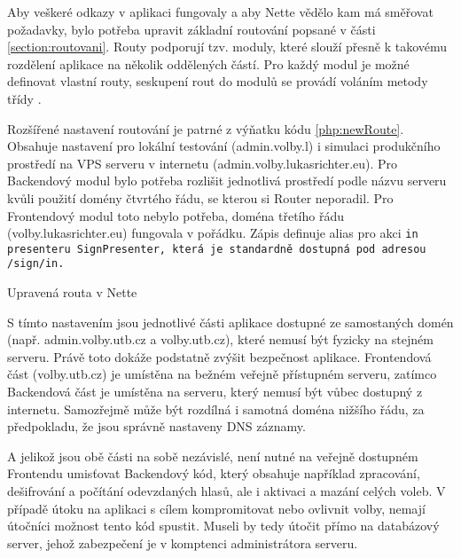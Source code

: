 Aby veškeré odkazy v aplikaci fungovaly a aby Nette vědělo kam má směřovat požadavky, bylo potřeba upravit základní routování popsané v části \ref{section:routovani}. Routy podporují tzv. moduly, které slouží přesně k takovému rozdělení aplikace na několik oddělených částí. Pro každý modul je možné definovat vlastní routy, seskupení rout do modulů se provádí voláním metody  %
třídy . 

Rozšířené nastavení routování je patrné z výňatku kódu \ref{php:newRoute}. Obsahuje nastavení pro lokální testování (admin.volby.l) i simulaci produkčního prostředí na VPS serveru v internetu (admin.volby.lukasrichter.eu). Pro Backendový modul bylo potřeba rozlišit jednotlivá prostředí podle názvu serveru kvůli použití domény čtvrtého řádu, se kterou si Router neporadil. Pro Frontendový modul toto nebylo potřeba, doména třetího řádu (volby.lukasrichter.eu) fungovala v pořádku. Zápis  definuje alias pro akci \tt{in} presenteru \tt{SignPresenter}, která je standardně dostupná pod adresou \tt{/sign/in}.

\begin{listing}[ht]
\caption{Upravená routa v Nette}
\label{php:newRoute}
\end{listing}

S tímto nastavením jsou jednotlivé části aplikace dostupné ze samostaných domén (např. admin.volby.utb.cz a volby.utb.cz), které nemusí být fyzicky na stejném serveru. Právě toto dokáže podstatně zvýšit bezpečnost aplikace. Frontendová část (volby.utb.cz) je umístěna na bežném veřejně přístupném serveru, zatímco Backendová část je umístěna na serveru, který nemusí být vůbec dostupný z internetu. Samozřejmě může být rozdílná i samotná doména nižšího řádu, za předpokladu, že jsou správně nastaveny DNS záznamy.

A jelikož jsou obě části na sobě nezávislé, není nutné na veřejně dostupném Frontendu umisťovat Backendový kód, který obsahuje například zpracování, dešifrování a počítání odevzdaných hlasů, ale i aktivaci a mazání celých voleb. V případě útoku na aplikaci s cílem kompromitovat nebo ovlivnit volby, nemají útočníci možnost tento kód spustit. Museli by tedy útočit přímo na databázový server, jehož zabezpečení je v komptenci administrátora serveru.